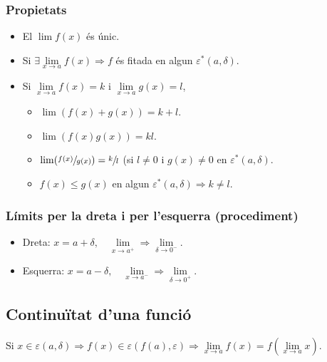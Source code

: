 \subsubsection*{Propietats}
\begin{itemize}
    \item El $\lim f(x)$ és únic.
    \item Si $\exists \lim\limits_{x \to a} f(x) \Rightarrow f$ és fitada en algun $\varepsilon ^{\ast} (a, \delta)$.
    \item Si $\lim\limits_{x \to a} f(x) = k$ i $\lim\limits_{x \to a} g(x) = l$,
    \begin{itemize}
        \item $\lim (f(x) + g(x)) = k + l$.
        \item $\lim (f(x) g(x)) = kl$.
        \item $\lim (\sfrac{f(x)}{g(x)}) = \sfrac{k}{l}$ (si $l \neq 0$ i $g(x) \neq 0$ en $\varepsilon ^{\ast} (a, \delta)$.
        \item $f (x) \leq g(x)$ en algun $\varepsilon ^{\ast} (a, \delta) \Rightarrow k \neq l$.
    \end{itemize}
\end{itemize} 

\subsubsection*{Límits per la dreta i per l'esquerra (procediment)}
\begin{itemize}
    \item Dreta: $ x = a + \delta , \quad \lim\limits_{x \to a^{+}} \Rightarrow \lim\limits_{\delta \to 0^{-}} $.
    \item Esquerra: $ x = a - \delta , \quad \lim\limits_{x \to a^{-}} \Rightarrow \lim\limits_{\delta \to 0^{+}} $.
\end{itemize}

\subsection{Continuïtat d'una funció}
Si $x \in \varepsilon (a, \delta) \Rightarrow f(x) \in \varepsilon (f(a), \varepsilon ) \Rightarrow \lim\limits_{x \to a} f(x) = f(\lim\limits_{x \to a} x)$.

